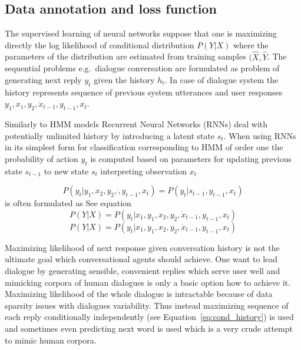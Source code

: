 \documentclass[11pt]{article}
\begin{document}
\subsection{Data annotation and loss function}
\label{sub:data_annotation}

The supervised learning of neural networks suppose that one is maximizing directly the log likelihood of conditional distribution $ P(Y| X) $ where the parameters of the distribution are estimated from training samples $ (\hat{X}, \hat{Y} $.
The sequential problems e.g.\ dialogue conversation are formulated as problem of generating next reply $y_t$ given the history $h_t$.
In case of dialogue system the history represents sequence of previous system utterances and user responses $ y_1, x_1, y_2, \dot x_{t-1}, y_{t-1}, x_t $.

Similarly to HMM models Recurrent Neural Networks (RNNs) deal with potentially unlimited history by introducing a latent state $ s_t$.
When using RNNs~\cite{gers_learning_2000} in its simplest form for classification corresponding to HMM of order one the probability of action $ y_t $ is computed based on parameters for updating previous state $s_{t-1}$ to new state $s_t$ interpreting observation $x_t$ 

\begin{equation}
    P(y_t| y_1, x_2, y_2, \dot, y_{t-1}, x_t) = P(y_t | s_{t-1}, y_{t-1}, x_t)
\end{equation}
is often formulated as  See equation
\begin{equation}
    P(Y|X) = P(y_t | x_1, y_1, x_2, y_2, \dot x_{t-1}, y_{t-1}, x_t)
\end{equation}
\begin{equation}
    \label{eq:cond_history}
    P(Y|X) = P(y_t | x_1, y_1, x_2, y_2, \dot x_{t-1}, y_{t-1}, x_t)
\end{equation}

Maximizing likelihood of next response given conversation history is not the ultimate goal which conversational agents should achieve.
One want to lead dialogue by generating sensible, convenient replies which serve user well and mimicking corpora of human dialogues is only a basic option how to achieve it.
Maximizing likelihood of the whole dialogue is intractable because of data sparsity issues with dialogues variability.
Thus instead maximizing sequence of each reply conditionally independently (see Equation~\ref{eq:cond_history}) is used and sometimes even predicting next word is used which is a very crude attempt to mimic human corpora.
\end{document}
